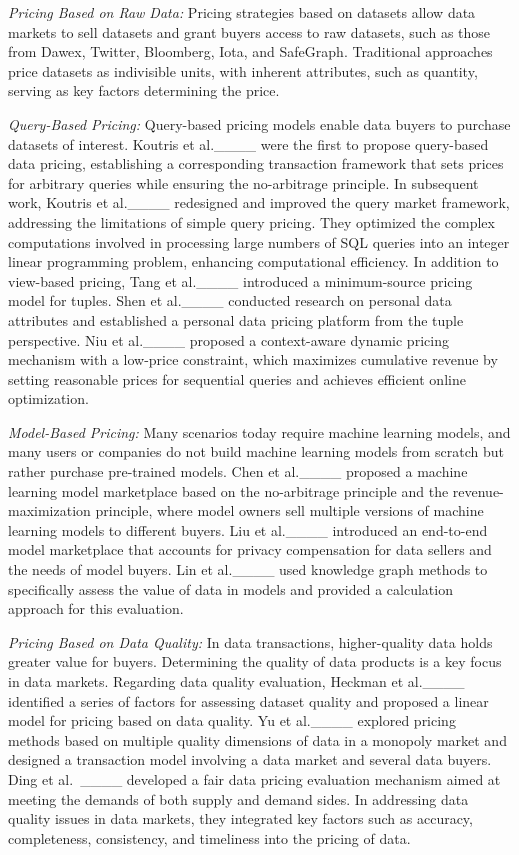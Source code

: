 \textit{Pricing Based on Raw Data:} 
Pricing strategies based on datasets allow data markets to sell datasets and grant buyers access to raw datasets, such as those from Dawex, Twitter, Bloomberg, Iota, and SafeGraph. Traditional approaches price datasets as indivisible units, with inherent attributes, such as quantity, serving as key factors determining the price.

\textit{Query-Based Pricing:} 
Query-based pricing models enable data buyers to purchase datasets of interest. Koutris et al.____ were the first to propose query-based data pricing, establishing a corresponding transaction framework that sets prices for arbitrary queries while ensuring the no-arbitrage principle. In subsequent work, Koutris et al.____ redesigned and improved the query market framework, addressing the limitations of simple query pricing. They optimized the complex computations involved in processing large numbers of SQL queries into an integer linear programming problem, enhancing computational efficiency. In addition to view-based pricing, Tang et al.____ introduced a minimum-source pricing model for tuples. Shen et al.____ conducted research on personal data attributes and established a personal data pricing platform from the tuple perspective. Niu et al.____ proposed a context-aware dynamic pricing mechanism with a low-price constraint, which maximizes cumulative revenue by setting reasonable prices for sequential queries and achieves efficient online optimization.

\textit{Model-Based Pricing:} 
Many scenarios today require machine learning models, and many users or companies do not build machine learning models from scratch but rather purchase pre-trained models. Chen et al.____ proposed a machine learning model marketplace based on the no-arbitrage principle and the revenue-maximization principle, where model owners sell multiple versions of machine learning models to different buyers. Liu et al.____ introduced an end-to-end model marketplace that accounts for privacy compensation for data sellers and the needs of model buyers. Lin et al.____ used knowledge graph methods to specifically assess the value of data in models and provided a calculation approach for this evaluation.

\textit{Pricing Based on Data Quality:} 
In data transactions, higher-quality data holds greater value for buyers. Determining the quality of data products is a key focus in data markets. Regarding data quality evaluation, Heckman et al.____ identified a series of factors for assessing dataset quality and proposed a linear model for pricing based on data quality. Yu et al.____ explored pricing methods based on multiple quality dimensions of data in a monopoly market and designed a transaction model involving a data market and several data buyers. Ding et al.~____ developed a fair data pricing evaluation mechanism aimed at meeting the demands of both supply and demand sides. In addressing data quality issues in data markets, they integrated key factors such as accuracy, completeness, consistency, and timeliness into the pricing of data.

